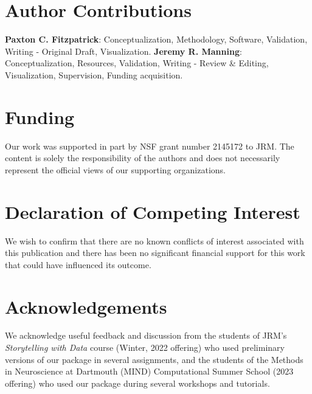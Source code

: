 \documentclass[preprint,12pt,a4paper]{elsarticle}
\begin{document}
\section*{Author Contributions}

\textbf{Paxton C. Fitzpatrick}: Conceptualization, Methodology,
Software, Validation, Writing - Original Draft,
Visualization. \textbf{Jeremy R. Manning}: Conceptualization,
Resources, Validation, Writing - Review \& Editing, Visualization, Supervision,
Funding acquisition.

\section*{Funding}

Our work was supported in part by NSF grant number 2145172 to JRM\@.
The content is solely the responsibility of the authors and does not
necessarily represent the official views of our supporting
organizations.


\section*{Declaration of Competing Interest}

We wish to confirm that there are no known conflicts of interest
associated with this publication and there has been no significant
financial support for this work that could have influenced its
outcome.


\section*{Acknowledgements}

We acknowledge useful feedback and discussion from the students of
JRM's \textit{Storytelling with Data} course (Winter, 2022 offering)
who used preliminary versions of our package in several assignments,
and the students of the Methods in Neuroscience at Dartmouth (MIND)
Computational Summer School (2023 offering) who used our package
during several workshops and tutorials.




\end{document}
